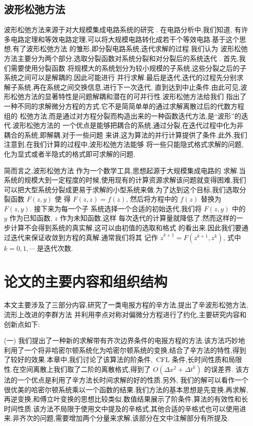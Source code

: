 \subsection{波形松弛方法}

波形松弛方法来源于对大规模集成电路系统的研究 \cite{lelarasmee1982waveform}. 在电路分析中,我们知道,
有许多电路定理和等效电路定理,可以将大规模电路转化成若干个等效电路.基于这个思想,有了波形松弛方法
的雏形,即分裂电路系统,迭代求解的过程.我们认为
波形松弛方法主要分为两个部分,选取分裂函数对系统分裂和对分裂后的系统迭代
 \cite{jiang2009wr,burrage1995parallel,jacob1985waveform}. 首先,我们需要使用分裂函数
 将规模大的系统划分为较小规模的子系统,这些分裂之后的子系统之间可以是解耦的,因此可能进行
 并行求解.最后是迭代,迭代的过程先分别求解子系统,再在系统之间交换信息,进行下一次迭代,
直到达到中止条件.由此可见,波形松弛方法的显著特性是问题解耦和潜在的可并行性.波形松弛方法给我们
指出了一种不同的求解微分方程的方式.它不是简简单单的通过求解离散过后的代数方程组的
松弛方法,而是通过对方程分裂而构造出来的一种函数迭代方法,是``波形''的迭代.波形松弛方法的
一个优点是能够把耦合的系统,通过分裂,在迭代过程中化为非耦合的系统,即解耦.对于一些问题
来讲,这为算法的并行计算提供了条件.此外,我们注意到,在我们计算的过程中,波形松弛方法能够
将一些只能隐式格式求解的问题,化为显式或者半隐式的格式即可求解的问题.

简而言之,波形松弛方法 \cite{jiang2009wr} 作为一个数学工具,思想起源于大规模集成电路的
求解.当系统的规模大到一定程度的时候,使用现有的计算资源求解该问题就变得困难,我们
可以把大型系统分裂成更易于求解的小型系统来做.为了达到这个目标,我们选取分裂函数 $F(z,y)$ 使
得 $F(z,z)=f(z)$, 然后将方程中的 $f(z)$ 替换为 $F(z,y)$. 接下来为每一个子
系统选择一个合适的初始迭代,我们将 $F(z,y)$ 中的 $y$ 作为已知函数, $z$ 作为未知函数,这样
每次迭代的计算量就降低了.然而这样的一步计算不会得到系统的真实解,这可以由初值的选取和格式
的看出来.因此我们要通过迭代来保证收敛到方程的真解.通常我们将其
记作 $\dot{z}^{k+1}=F(z^{k+1},z^{k})$, 式中 $k=0,1,\cdots$ 是迭代次数.

\section{论文的主要内容和组织结构}

本文主要涉及了三部分内容,研究了一类电报方程的辛方法,提出了辛波形松弛方法,流形上改进的李群方法
并利用李点对称对偏微分方程进行了约化,主要研究内容和创新点如下:

(一) 我们提出了一种新的求解带有齐次边界条件的电报方程的方法.该方法巧妙地利用了一个将非哈密尔顿系统化为哈密尔顿系统的变换,结合了辛方法的特性,得到了较好的效果.本章中,我们讨论了该算法的阶条件,~CFL 条件,长时间性质和局限性.在空间离散上我们取了二阶的离散格式,得到了 $O(\Delta x^2+ \Delta
t^k)$ 的误差界. 该方法的一个优点是利用了辛方法长时间求解的好的性质.另外, 我们的解可以看作一个很优美的哈密尔顿系统乘以一个函数的结果.我们方法的基本思想是先变换,再求解,再逆变换,和傅立叶变换的思想比较类似.数值结果展示了阶条件,算法的有效性和长时间性质.该方法不局限于使用文中提及的辛格式,其他合适的辛格式也可以使用进来.非齐次的问题,需要增加两个分量来求解,该部分在文中注解部分有所提及.

